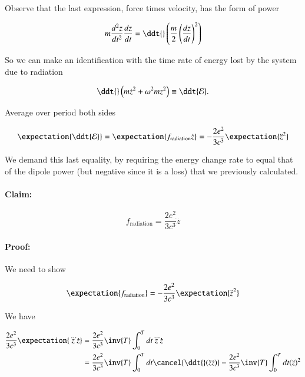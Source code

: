 Observe that the last expression, force times velocity, has the form of power

\begin{equation}\label{eqn:relativisticElectrodynamicsL26:250}
m \frac{d^2 z}{dt^2} \frac{dz}{dt} = \ddt{} \left( \frac{m}{2} \left( \frac{dz}{dt} \right)^2 \right)
\end{equation}

So we can make an identification with the time rate of energy lost by the system due to radiation

\begin{equation}\label{eqn:relativisticElectrodynamicsL26:270}
\ddt{} 
\left( m \dot{z}^2 + \omega^2 m z^2 \right) 
\equiv \ddt{\mathcal{E}}.
\end{equation}

Average over period both sides

\begin{equation}\label{eqn:relativisticElectrodynamicsL26:290}
\expectation{ \ddt{\mathcal{E}} } = 
\expectation{ f_{\text{radiation}} \dot{z} }
=
- \frac{2 e^2 }{3 c^3} \expectation{\ddot{z}^2}
\end{equation}

We demand this last equality, by requiring the energy change rate to equal that of the dipole power (but negative since it is a loss) that we previously calculated.

\paragraph{Claim:} 

\begin{equation}\label{eqn:relativisticElectrodynamicsL26:310}
f_{\text{radiation}} = \frac{2 e^2 }{3 c^3} \dddot{z}
\end{equation}

\paragraph{Proof:} 

We need to show 

\begin{equation}\label{eqn:relativisticElectrodynamicsL26:330}
\expectation{ f_{\text{radiation}} }
= - \frac{2 e^2 }{3 c^3} \expectation{\ddot{z}^2}
\end{equation}

We have

\begin{align*}
\frac{2 e^2}{3 c^3} \expectation{ \dddot{z} \dot{z} } 
&= \frac{2 e^2}{3 c^3} \inv{T} \int_0^T dt \dddot{z} \dot{z} \\
&= 
\frac{2 e^2}{3 c^3} \inv{T} \int_0^T dt \cancel{\ddt{} (\ddot{z} \dot{z}) }
-\frac{2 e^2}{3 c^3} \inv{T} \int_0^T dt (\ddot{z})^2
\end{align*}

